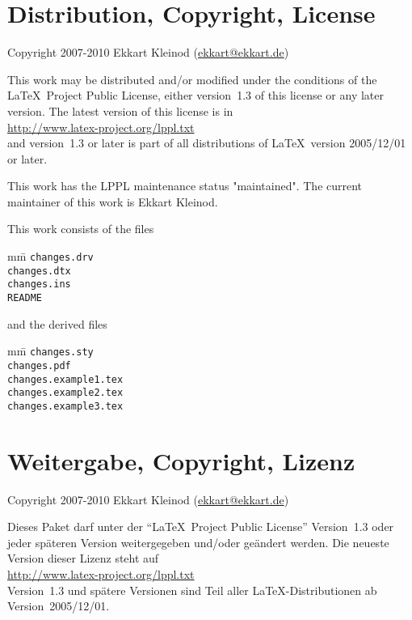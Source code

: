 \ifENGLISH
 \section{Distribution, Copyright, License}

 Copyright 2007-2010 Ekkart Kleinod (\href{mailto:ekkart@ekkart.de}{ekkart@ekkart.de})

 This work may be distributed and/or modified under the
 conditions of the \LaTeX\ Project Public License, either version~1.3
 of this license or any later version.
 The latest version of this license is in\\
	\url{http://www.latex-project.org/lppl.txt}\\
 and version~1.3 or later is part of all distributions of \LaTeX\
 version 2005/12/01 or later.

 This work has the LPPL maintenance status "maintained".
 The current maintainer of this work is Ekkart Kleinod.

 This work consists of the files
 \begin{tabbing}
	mm\=\kill
	\>\texttt{changes.drv}\\
	\>\texttt{changes.dtx}\\
	\>\texttt{changes.ins}\\
	\>\texttt{README}
 \end{tabbing}
 and the derived files
 \begin{tabbing}
	mm\=\kill
	\>\texttt{changes.sty}\\
	\>\texttt{changes.pdf}\\
	\>\texttt{changes.example1.tex}\\
	\>\texttt{changes.example2.tex}\\
	\>\texttt{changes.example3.tex}
 \end{tabbing}
\fi
	\ifGERMAN
	 \section{Weitergabe, Copyright, Lizenz}

	 Copyright 2007-2010 Ekkart Kleinod (\href{mailto:ekkart@ekkart.de}{ekkart@ekkart.de})

	 Dieses Paket darf unter der "`\LaTeX\ Project Public License"' Version~1.3 oder jeder späteren Version weitergegeben und/oder geändert werden.
	 Die neueste Version dieser Lizenz steht auf\\
		\url{http://www.latex-project.org/lppl.txt}\\
	 Version~1.3 und spätere Versionen sind Teil aller \LaTeX-Distributionen ab Version~2005/12/01.

